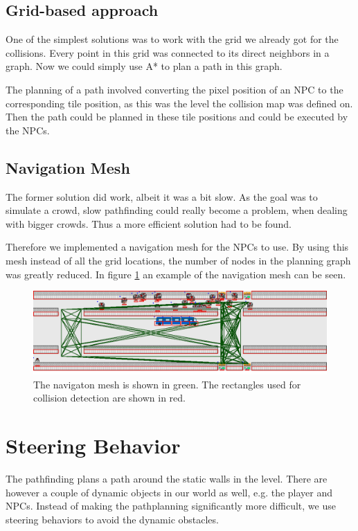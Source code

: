 \documentclass[a4paper,pdf,12pt]{article}
\begin{document}
\subsection{Grid-based approach}
One of the simplest solutions was to work with the grid we already got for the collisions. Every point in this grid was connected to its direct neighbors in a graph. Now we could simply use A* to plan a path in this graph. 

The planning of a path involved converting the pixel position of an NPC to the corresponding tile position, as this was the level the collision map was defined on. Then the path could be planned in these tile positions and could be executed by the NPCs.

\subsection{Navigation Mesh}
The former solution did work, albeit it was a bit slow. As the goal was to simulate a crowd, slow pathfinding could really become a problem, when dealing with bigger crowds. Thus a more efficient solution had to be found.

Therefore we implemented a navigation mesh for the NPCs to use. By using this mesh instead of all the grid locations, the number of nodes in the planning graph was greatly reduced. In figure \ref{fig:mesh} an example of the navigation mesh can be seen. 

\begin{figure}[h!]
\centering
\includegraphics[width = 1.0 \textwidth]{../screenshots/screenshot_16920.png}
\caption{The navigaton mesh is shown in green. The rectangles used for collision detection are shown in red.}
\label{fig:mesh}
\end{figure}

\section{Steering Behavior}
\label{sec:Steering Behavior}

The pathfinding plans a path around the static walls in the level. There are however a couple of dynamic objects in our world as well, e.g. the player and NPCs. Instead of making the pathplanning significantly more difficult, we use steering behaviors to avoid the dynamic obstacles. 
\end{document}
